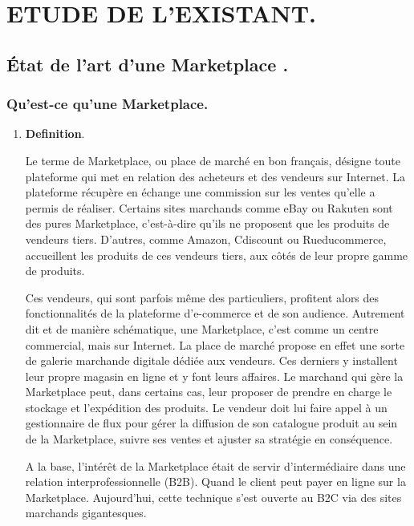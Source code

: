 \chapter{ETUDE DE L’EXISTANT.}     %
\thispagestyle{fancy}
\section{État de l’art d’une Marketplace .}

\subsection{Qu’est-ce qu’une Marketplace.}

\begin{enumerate}
		\item  \textbf{Definition}.
		
Le terme de Marketplace, ou place de marché en bon français, désigne toute plateforme qui met en relation des acheteurs et des vendeurs sur Internet. La plateforme récupère en échange une commission sur les ventes qu'elle a permis de réaliser. Certains sites marchands comme eBay ou Rakuten sont des pures Marketplace, c'est-à-dire qu'ils ne proposent que les produits de vendeurs tiers. D'autres, comme Amazon, Cdiscount ou Rueducommerce, accueillent les produits de ces vendeurs tiers, aux côtés de leur propre gamme de produits\cite{Ref3}.
		
Ces vendeurs, qui sont parfois même des particuliers, profitent alors des fonctionnalités de la plateforme d'e-commerce et de son audience. Autrement dit et de manière schématique, une Marketplace, c'est comme un centre commercial, mais sur Internet. La place de marché propose en effet une sorte de galerie marchande digitale dédiée aux vendeurs. Ces derniers y installent leur propre magasin en ligne et y font leurs affaires. Le marchand qui gère la Marketplace peut, dans certains cas, leur proposer de prendre en charge le stockage et l'expédition des produits. Le vendeur doit lui faire appel à un gestionnaire de flux pour gérer la diffusion de son catalogue produit au sein de la Marketplace, suivre ses ventes et ajuster sa stratégie en conséquence.

A la base, l'intérêt de la Marketplace était de servir d'intermédiaire dans une relation interprofessionnelle (B2B). Quand le client peut payer en ligne sur la Marketplace. Aujourd'hui, cette technique s'est ouverte au B2C via des sites marchands gigantesques. 


\end{enumerate}
